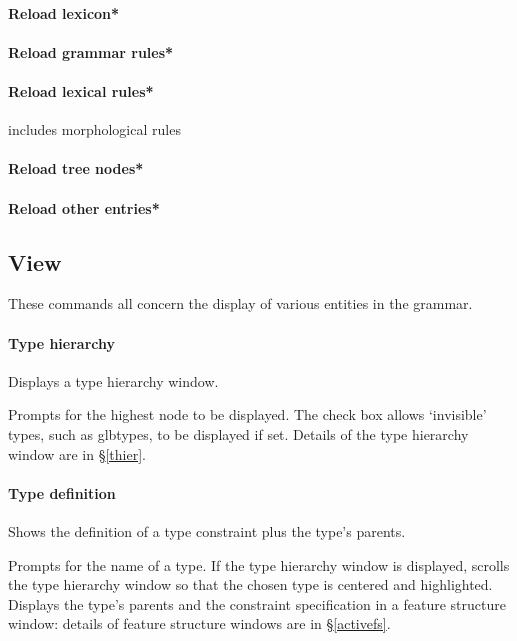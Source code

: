 \documentclass[12pt]{report}
\begin{document}
\paragraph{Reload lexicon*}

\paragraph{Reload grammar rules*}

\paragraph{Reload lexical rules*}
includes morphological rules

\paragraph{Reload tree nodes*}

\paragraph{Reload other entries*}


\subsection{View}
\label{view}

These commands all concern the display of various entities in the grammar.

\paragraph{Type hierarchy}
Displays a type hierarchy window.

Prompts for the highest node to be displayed.
The check box allows `invisible' types, such as glbtypes, to be
displayed if set.  Details of the type hierarchy window are in 
\S\ref{thier}.

\paragraph{Type definition}
\label{type-def}
Shows the definition of a type constraint plus the type's 
parents.

Prompts for the name of a type. 
If the type hierarchy window is displayed, scrolls the
type hierarchy window so that the chosen type is centered and
highlighted.  
Displays the type's
parents and the constraint specification in a feature
structure window:
details of feature structure windows are in \S\ref{activefs}.
\end{document}
